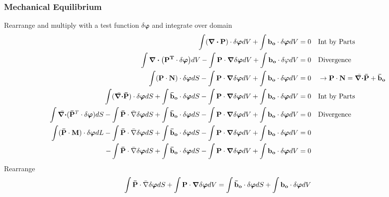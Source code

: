 \documentclass[12pt,3p]{article}
\numberwithin{equation}{section}
\begin{document}
\subsubsection{Mechanical Equilibrium} 
Rearrange and multiply with a test function $\delta \boldsymbol\varphi$ and integrate over domain 
\begin{align*}
\int (\div \mathbf{P}) \cdot \delta \boldsymbol\varphi dV + \int \mathbf{b_o} \cdot \delta \boldsymbol\varphi dV &= 0 \quad \text{Int by Parts} \\
\int \div (\mathbf{P^T} \cdot \delta \boldsymbol\varphi) dV - \int \mathbf{P} \cdot \grad \delta \boldsymbol\varphi dV+ \int \mathbf{b_o} \cdot \delta \varphi dV &= 0 \quad \text{Divergence} \\
\int (\mathbf{P} \cdot \mathbf{N}) \cdot \delta \boldsymbol\varphi dS - \int \mathbf{P} \cdot \grad \delta \boldsymbol\varphi dV+ \int \mathbf{b_o} \cdot \delta \boldsymbol\varphi dV &= 0 \quad \rightarrow \mathbf{P} \cdot \mathbf{N} = \bar{\div} \mathbf{\bar{P}} + \mathbf{\bar{b}_o} \\
\int (\bar{\div} \mathbf{\bar{P}}) \cdot \delta \boldsymbol\varphi dS + \int \mathbf{\bar{b}_o} \cdot \delta \boldsymbol\varphi dS - \int \mathbf{P} \cdot \grad \delta \boldsymbol\varphi dV+ \int \mathbf{b_o} \cdot \delta \boldsymbol\varphi dV &= 0 \quad \text{Int by Parts}\\
\int \bar{\div} (\mathbf{\bar{P}}^T \cdot \delta \boldsymbol\varphi) dS - \int \mathbf{\bar{P}} \cdot \bar{\nabla} \delta \boldsymbol\varphi dS + \int \mathbf{\bar{b}_o} \cdot \delta \boldsymbol\varphi dS - \int \mathbf{P} \cdot \grad \delta \boldsymbol\varphi dV+ \int \mathbf{b_o} \cdot \delta \boldsymbol\varphi dV &= 0 \quad \text{Divergence} \\
\int (\mathbf{\bar{P}} \cdot \mathbf{M}) \cdot \delta \boldsymbol\varphi dL - \int \mathbf{\bar{P}} \cdot \bar{\nabla} \delta \boldsymbol\varphi dS + \int \mathbf{\bar{b}_o} \cdot \delta \boldsymbol\varphi dS - \int \mathbf{P} \cdot \grad \delta \boldsymbol\varphi dV+ \int \mathbf{b_o} \cdot \delta \boldsymbol\varphi dV &= 0 \\
- \int \mathbf{\bar{P}} \cdot \bar{\nabla} \delta \boldsymbol\varphi dS + \int \mathbf{\bar{b}_o} \cdot \delta \boldsymbol\varphi dS - \int \mathbf{P} \cdot \grad \delta \boldsymbol\varphi dV+ \int \mathbf{b_o} \cdot \delta \boldsymbol\varphi dV &= 0 
\end{align*}
Rearrange 
\begin{equation}\label{MechWeakForm}
\int \mathbf{\bar{P}} \cdot \bar{\nabla} \delta \boldsymbol\varphi dS + \int \mathbf{P} \cdot \grad \delta \boldsymbol\varphi dV = \int \mathbf{\bar{b}_o} \cdot \delta \boldsymbol\varphi dS + \int \mathbf{b_o} \cdot \delta \boldsymbol\varphi dV
\end{equation}
\end{document}
